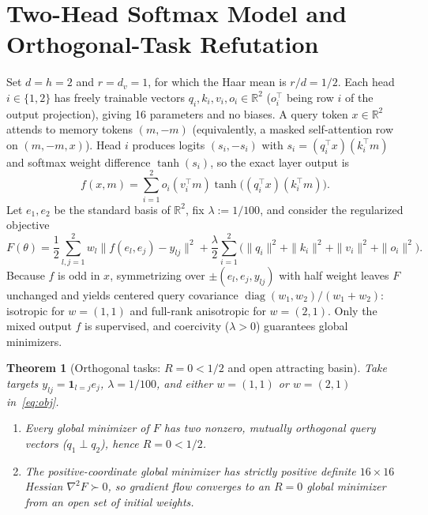 \documentclass[11pt]{article}
\theoremstyle{plain}
\newtheorem{theorem}{Theorem}
\theoremstyle{definition}
\theoremstyle{remark}
\DeclareMathOperator{\diag}{diag}
\begin{document}
\section{Two-Head Softmax Model and Orthogonal-Task Refutation}

Set $d = h = 2$ and $r = d_v = 1$, for which the Haar mean is $r/d = 1/2$. Each head $i \in \{1, 2\}$ has freely trainable vectors $q_i, k_i, v_i, o_i \in \mathbb{R}^2$ ($o_i^\top$ being row $i$ of the output projection), giving 16 parameters and no biases. A query token $x \in \mathbb{R}^2$ attends to memory tokens $(m, -m)$ (equivalently, a masked self-attention row on $(m, -m, x)$). Head $i$ produces logits $(s_i, -s_i)$ with $s_i = (q_i^\top x)(k_i^\top m)$ and softmax weight difference $\tanh(s_i)$, so the exact layer output is
\begin{equation}\label{eq:layer}
f(x, m) = \sum_{i=1}^2 o_i (v_i^\top m) \tanh\bigl((q_i^\top x)(k_i^\top m)\bigr).
\end{equation}
Let $e_1, e_2$ be the standard basis of $\mathbb{R}^2$, fix $\lambda := 1/100$, and consider the regularized objective
\begin{equation}\label{eq:obj}
F(\theta) = \frac{1}{2}\sum_{l,j=1}^2 w_l \|f(e_l, e_j) - y_{lj}\|^2
+ \frac{\lambda}{2}\sum_{i=1}^2 \bigl(\|q_i\|^2 + \|k_i\|^2 + \|v_i\|^2 + \|o_i\|^2\bigr).
\end{equation}
Because $f$ is odd in $x$, symmetrizing over $\pm(e_l, e_j, y_{lj})$ with half weight leaves $F$ unchanged and yields centered query covariance $\diag(w_1, w_2)/(w_1 + w_2)$: isotropic for $w = (1, 1)$ and full-rank anisotropic for $w = (2, 1)$. Only the mixed output $f$ is supervised, and coercivity ($\lambda > 0$) guarantees global minimizers.

\begin{theorem}[Orthogonal tasks: $R = 0 < 1/2$ and open attracting basin]\label{thm:orth}
Take targets $y_{lj} = \mathbf{1}_{l=j} e_j$, $\lambda = 1/100$, and either $w = (1, 1)$ or $w = (2, 1)$ in~\eqref{eq:obj}.
\begin{enumerate}[label=\textup{(\arabic*)}]
\item Every global minimizer of $F$ has two nonzero, mutually orthogonal query vectors ($q_1 \perp q_2$), hence $R = 0 < 1/2$.
\item The positive-coordinate global minimizer has strictly positive definite $16 \times 16$ Hessian $\nabla^2 F \succ 0$, so gradient flow converges to an $R = 0$ global minimizer from an open set of initial weights.
\end{enumerate}
\end{theorem}
\end{document}
